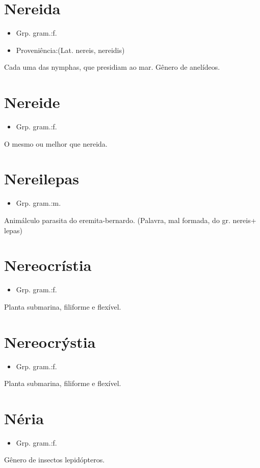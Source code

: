 \section{Nereida}
\begin{itemize}
\item {Grp. gram.:f.}
\end{itemize}
\begin{itemize}
\item {Proveniência:(Lat. \textunderscore nereis\textunderscore , \textunderscore nereidis\textunderscore )}
\end{itemize}
Cada uma das nymphas, que presidiam ao mar.
Gênero de anelídeos.
\section{Nereide}
\begin{itemize}
\item {Grp. gram.:f.}
\end{itemize}
O mesmo ou melhor que \textunderscore nereida\textunderscore .
\section{Nereilepas}
\begin{itemize}
\item {Grp. gram.:m.}
\end{itemize}
Animálculo parasita do eremita-bernardo.
(Palavra, mal formada, do gr. \textunderscore nereis\textunderscore  + \textunderscore lepas\textunderscore )
\section{Nereocrístia}
\begin{itemize}
\item {Grp. gram.:f.}
\end{itemize}
Planta submarina, filiforme e flexível.
\section{Nereocrýstia}
\begin{itemize}
\item {Grp. gram.:f.}
\end{itemize}
Planta submarina, filiforme e flexível.
\section{Néria}
\begin{itemize}
\item {Grp. gram.:f.}
\end{itemize}
Gênero de insectos lepidópteros.
